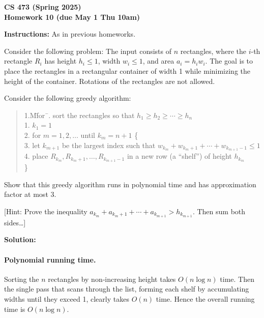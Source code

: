 \documentclass[11pt]{article}
\begin{document}
\begin{center}\Large\bf 
CS 473 (Spring 2025)\\
Homework 10 (due May 1 Thu 10am)
\end{center}

\medskip\noindent
{\bf Instructions:} As in previous homeworks.

\begin{description}



\bigskip
\item[Problem 10.1:]
Consider the following problem:
The input consists of $n$ rectangles, where the $i$-th rectangle $R_i$
has height $h_i\le 1$, width $w_i\le 1$, and area $a_i=h_iw_i$.
The goal is to place the rectangles in a rectangular container of width 1
while minimizing the height of the 
container.  Rotations of the rectangles are not allowed.

Consider the following greedy algorithm: 
\begin{quote}
\begin{tabbing}
1.M\= for\ \=.\> sort the rectangles so that $h_1\ge h_2\ge\cdots\ge h_n$\\
1.\> $k_1=1$\\
2.\> for $m=1,2,\ldots$ until $k_m=n+1$ \{\\
3.\>\> let $k_{m+1}$ be the largest index such that
$w_{k_m}+w_{k_m+1}+\cdots+w_{k_{m+1}-1}\le 1$\\
4.\>\> place $R_{k_m},R_{k_m+1},\ldots, R_{k_{m+1}-1}$ in a new row (a ``shelf'') of
height $h_{k_m}$\\
\} 
\end{tabbing}
\end{quote}

Show that this greedy algorithm runs in polynomial time and
has approximation factor at most 3.

[Hint: Prove the inequality
$a_{k_m}+a_{k_m+1}+\cdots+a_{k_{m+1}} > h_{k_{m+1}}$.
Then sum both sides\ldots]

\newpage
\textbf{Solution:}
\paragraph{Polynomial running time.}
Sorting the $n$ rectangles by non‐increasing height takes $O(n\log n)$ time.  
Then the single pass that scans through the list, forming each shelf by accumulating widths until they exceed 1, clearly takes $O(n)$ time.  Hence the overall running time is $O(n\log n)$.


\end{description}
\end{document}
